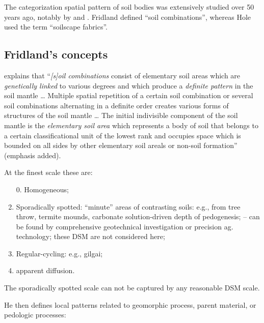 \documentclass[soil, manuscript]{copernicus}
\begin{document}
\par
The categorization spatial pattern of soil bodies was extensively studied over 50 years ago, notably by \citet{Fridland1972,Fridland1974} and \citet{holeApproachLandscapeAnalysis1978, holeSoilLandscapeAnalysis1985}.
%
Fridland defined ``soil combinations'', whereas Hole used the term ``soilscape fabrics''.
%

\subsection{Fridland's concepts}

\par
\citet{Fridland1974} explains that ``\emph{[s]oil combinations} consist of elementary soil areas which are \emph{genetically linked} to various degrees and which produce a \emph{definite pattern} in the soil mantle
%
\ldots
%
Multiple spatial repetition of a certain soil combination or several soil combinations alternating in a definite order creates various forms of structures of the soil mantle
%
\ldots
%
The initial indivisible component of the soil mantle is the \emph{elementary soil area} which represents a body of soil that belongs to a certain classificational unit of the lowest rank and occupies space which is bounded on all sides by other elementary soil areals or non-soil formation'' (emphasis added).

\par
At the finest scale these are:

\begin{enumerate}
\item[0.] Homogeneous;
\item Sporadically spotted: ``minute'' areas of contrasting soils: e.g., from tree throw, termite mounds,  carbonate solution-driven  depth of pedogenesis;
-- can be found by comprehensive geotechnical investigation or precision ag. technology; these DSM are not considered here;
\item Regular-cycling: e.g.,  gilgai;
\item apparent diffusion.
\end{enumerate}

The sporadically spotted scale can not be captured by any reasonable DSM scale.

He then defines local patterns related to geomorphic process, parent material, or pedologic processes:
\end{document}
